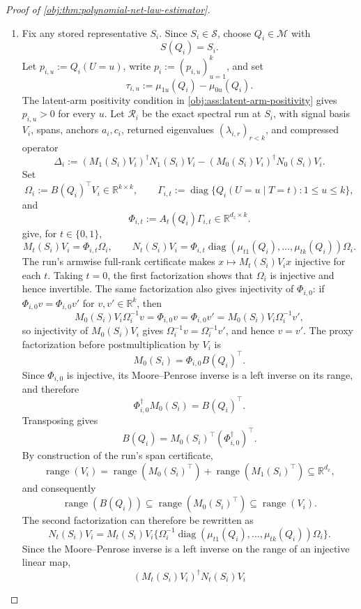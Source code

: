 \begin{proof}[Proof of \cref{obj:thm:polynomial-net-law-estimator}]
\begin{enumerate}
\item Fix any stored representative \(S_i\).  Since \(S_i\in\mathscr S\), choose
\(Q_i\in\mathcal M\) with
\[
S(Q_i)=S_i.
\]
Let \(p_{i,u}:=Q_i(U=u)\), write \(p_i:=(p_{i,u})_{u=1}^k\), and set
\[
\tau_{i,u}:=\mu_{1u}(Q_i)-\mu_{0u}(Q_i).
\]
The latent-arm positivity condition in \cref{obj:ass:latent-arm-positivity}
gives \(p_{i,u}>0\) for every \(u\).  Let \(\mathcal R_i\) be the exact
spectral run at \(S_i\), with signal basis \(V_i\), spans, anchors \(a_i,c_i\),
returned eigenvalues \((\lambda_{i,r})_{r<k}\), and compressed operator
\[
\Delta_i
:=(M_1(S_i)V_i)^\dagger N_1(S_i)V_i
 -(M_0(S_i)V_i)^\dagger N_0(S_i)V_i .
\]
Set
\[
\Omega_i:=B(Q_i)^\top V_i\in\mathbb R^{k\times k},
\qquad
\Gamma_{i,t}
:=\operatorname{diag}\{Q_i(U=u\mid T=t):1\le u\le k\},
\]
and
\[
\Phi_{i,t}:=A_t(Q_i)\Gamma_{i,t}\in\mathbb R^{d_z\times k}.
\]
give, for \(t\in\{0,1\}\),
\[
M_t(S_i)V_i=\Phi_{i,t}\Omega_i,
\qquad
N_t(S_i)V_i
=\Phi_{i,t}
\operatorname{diag}(\mu_{t1}(Q_i),\ldots,\mu_{tk}(Q_i))\Omega_i .
\]
The run's armwise full-rank certificate makes
\(x\mapsto M_t(S_i)V_ix\) injective for each \(t\).  Taking \(t=0\), the first
factorization shows that \(\Omega_i\) is injective and hence invertible.  The
same factorization also gives injectivity of \(\Phi_{i,0}\): if
\(\Phi_{i,0}v=\Phi_{i,0}v'\) for \(v,v'\in\mathbb R^k\), then
\[
M_0(S_i)V_i\Omega_i^{-1}v
=
\Phi_{i,0}v
=
\Phi_{i,0}v'
=
M_0(S_i)V_i\Omega_i^{-1}v',
\]
so injectivity of \(M_0(S_i)V_i\) gives
\(\Omega_i^{-1}v=\Omega_i^{-1}v'\), and hence \(v=v'\).  The proxy
factorization before postmultiplication by \(V_i\) is
\[
M_0(S_i)=\Phi_{i,0}B(Q_i)^\top .
\]
Since \(\Phi_{i,0}\) is injective, its Moore--Penrose inverse is a left inverse
on its range, and therefore
\[
\Phi_{i,0}^\dagger M_0(S_i)=B(Q_i)^\top .
\]
Transposing gives
\[
B(Q_i)=M_0(S_i)^\top(\Phi_{i,0}^\dagger)^\top .
\]
By construction of the run's span certificate,
\[
\operatorname{range}(V_i)
=
\operatorname{range}(M_0(S_i)^\top)+\operatorname{range}(M_1(S_i)^\top)
\subseteq\mathbb R^{d_x},
\]
and consequently
\[
\operatorname{range}(B(Q_i))
\subseteq
\operatorname{range}(M_0(S_i)^\top)
\subseteq
\operatorname{range}(V_i).
\]
The second factorization can therefore be rewritten as
\[
N_t(S_i)V_i
=
M_t(S_i)V_i
\{\Omega_i^{-1}
\operatorname{diag}(\mu_{t1}(Q_i),\ldots,\mu_{tk}(Q_i))\Omega_i\}.
\]
Since the Moore--Penrose inverse is a left inverse on the range of an injective
linear map,
\[
(M_t(S_i)V_i)^\dagger N_t(S_i)V_i
\]
\end{enumerate}
\end{proof}

